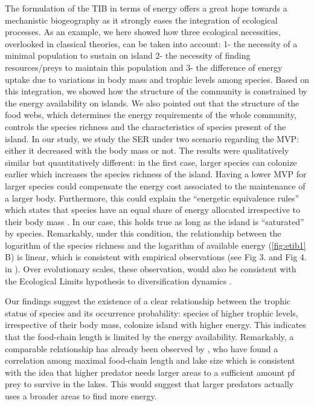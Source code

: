 The formulation of the TIB in terms of energy offers a great hope
towards a mechanistic biogeography as it strongly eases the integration
of ecological processes. As an example, we here showed how three
ecological necessities, overlooked in classical theories, can be taken
into account: 1- the necessity of a minimal population to sustain on
island 2- the necessity of finding resources/preys to maintain this
population and 3- the difference of energy uptake due to variations in
body mass and trophic levels among species. Based on this integration,
we showed how the structure of the community is constrained by the
energy availability on islands. We also pointed out that the structure
of the food webs, which determines the energy requirements of the whole
community, controls the species richness and the characteristics of
species present of the island. In our study, we study the SER under two
scenario regarding the MVP: either it decreased with the body mass or
not. The results were qualitatively similar but quantitatively
different: in the first case, larger species can colonize earlier which
increases the species richness of the island. Having a lower MVP for
larger species could compensate the energy cost associated to the
maintenance of a larger body. Furthermore, this could explain the
``energetic equivalence rules'' \citep{Nee1991} which states that
species have an equal share of energy allocated irrespective to their
body mass \citep{Brown2003, Damuth2007}. In our case, this holds true as
long as the island is ``saturated'' by species. Remarkably, under this
condition, the relationship between the logarithm of the species
richness and the logarithm of available energy (\ref{fig:etib1} B) is
linear, which is consistent with empirical observations (see Fig 3. and
Fig 4. in \citet{Wright1983}). Over evolutionary scales, these
observation, would also be consistent with the Ecological Limits
hypothesis to diversification dynamics \citep{Rabosky2015}.

Our findings suggest the existence of a clear relationship between the
trophic status of species and its occurrence probability: species of
higher trophic levels, irrespective of their body mass, colonize island
with higher energy. This indicates that the food-chain length is limited
by the energy availability. Remarkably, a comparable relationship has
already been observed by \citet{Post2000}, who have found a correlation
among maximal food-chain length and lake size which is consistent with
the idea that higher predator needs larger areas to a sufficient amount
pf prey to survive in the lakes. This would suggest that larger
predators actually uses a broader areas to find more energy.

